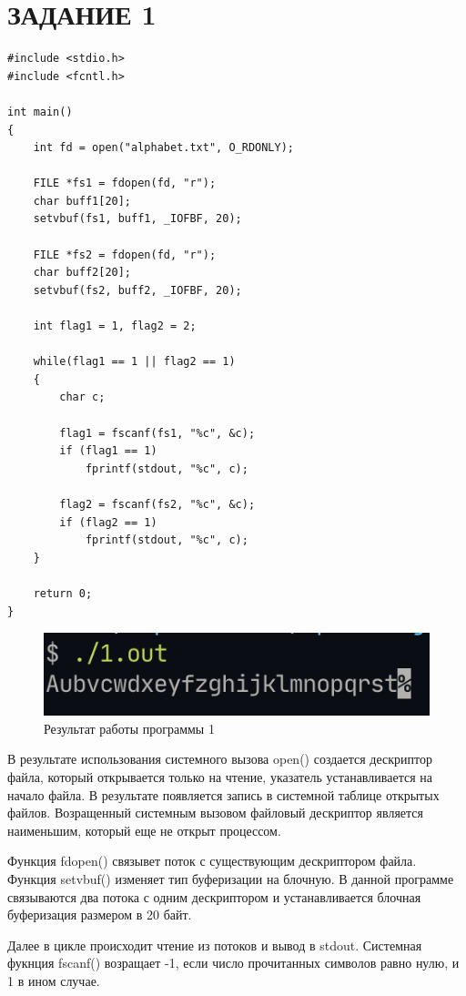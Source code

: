 \section{ЗАДАНИЕ 1}

\begin{lstlisting}[caption=Текст программы задания 1]
#include <stdio.h>
#include <fcntl.h>

int main()
{
    int fd = open("alphabet.txt", O_RDONLY);

    FILE *fs1 = fdopen(fd, "r");
    char buff1[20];
    setvbuf(fs1, buff1, _IOFBF, 20);

    FILE *fs2 = fdopen(fd, "r");
    char buff2[20];
    setvbuf(fs2, buff2, _IOFBF, 20);

    int flag1 = 1, flag2 = 2;

    while(flag1 == 1 || flag2 == 1)
    {
        char c;

        flag1 = fscanf(fs1, "%c", &c);
        if (flag1 == 1)
            fprintf(stdout, "%c", c);

        flag2 = fscanf(fs2, "%c", &c);
        if (flag2 == 1)
            fprintf(stdout, "%c", c);
    }

    return 0;
}
\end{lstlisting}

\begin{figure}[H]
    \centering
    \includegraphics[scale=1.3]{img/1.png}
    \caption{Результат работы программы 1}
\end{figure}

В результате использования системного вызова {\ttfamily open()} создается
дескриптор файла, который открывается только на чтение, указатель устанавливается
на начало файла. В результате появляется запись в системной
таблице открытых файлов. Возращенный системным вызовом файловый дескриптор
является наименьшим, который еще не открыт процессом.

Функция {\ttfamily fdopen()} связывет поток с существующим дескриптором файла.
Функция {\ttfamily setvbuf()} изменяет тип буферизации на блочную. В данной
программе связываются два потока с одним дескриптором и устанавливается
блочная буферизация размером в 20 байт.

Далее в цикле происходит чтение из потоков и вывод в {\ttfamily stdout}.
Системная фукнция {\ttfamily fscanf()} возращает -1, если число прочитанных
символов равно нулю, и 1 в ином случае.

